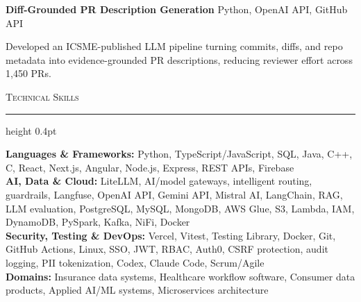 \documentclass[letterpaper,11pt]{article}
\newcommand{\resumesection}[1]{%
  \par\vspace{2pt}%
  {\large\scshape #1}\par\vspace{2pt}%
  \hrule height 0.4pt\vspace{2pt}%
}
\newcommand{\projectHeading}[2]{
  \textbf{#1} \hfill #2
}
\begin{document}
\vspace{-4pt}
\projectHeading{Diff-Grounded PR Description Generation}{Python, OpenAI API, GitHub API}
\begin{tightitemize}
  \item Developed an ICSME-published LLM pipeline turning commits, diffs, and repo metadata into evidence-grounded PR descriptions, reducing reviewer effort across 1,450 PRs.
\end{tightitemize}

\resumesection{Technical Skills}
\textbf{Languages \& Frameworks:} Python, TypeScript/JavaScript, SQL, Java, C++, C, React, Next.js, Angular, Node.js, Express, REST APIs, Firebase\\
\textbf{AI, Data \& Cloud:} LiteLLM, AI/model gateways, intelligent routing, guardrails, Langfuse, OpenAI API, Gemini API, Mistral AI, LangChain, RAG, LLM evaluation, PostgreSQL, MySQL, MongoDB, AWS Glue, S3, Lambda, IAM, DynamoDB, PySpark, Kafka, NiFi, Docker\\
\textbf{Security, Testing \& DevOps:} Vercel, Vitest, Testing Library, Docker, Git, GitHub Actions, Linux, SSO, JWT, RBAC, Auth0, CSRF protection, audit logging, PII tokenization, Codex, Claude Code, Scrum/Agile\\
\textbf{Domains:} Insurance data systems, Healthcare workflow software, Consumer data products, Applied AI/ML systems, Microservices architecture
\end{document}
